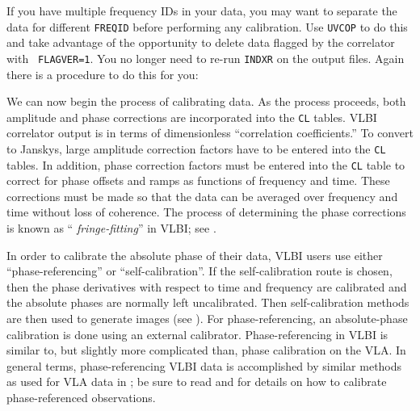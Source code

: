 
If you have multiple frequency IDs in your data, you may want to
separate the data for different {\tt FREQID} before performing any
calibration.  Use {\tt UVCOP} to do this and take advantage of the
opportunity to delete data flagged by the correlator with {\tt
FLAGVER=1}\@.  You no longer need to re-run {\tt INDXR} on the
output files.  Again there is a procedure to do this for you:

We can now begin the process of calibrating  data.  As the
 process proceeds, both amplitude and phase
corrections are incorporated into the {\tt CL} tables. VLBI correlator
output is in terms of dimensionless ``correlation coefficients.''  To
convert to Janskys, large amplitude correction factors have to be
entered into the {\tt CL} tables.  In addition, phase correction
factors must be entered into the {\tt CL} table to correct for phase
offsets and ramps as functions of frequency and time.  These
corrections must be made so that the data can be averaged over
frequency and time without loss of coherence.  The process of
determining the phase corrections is known as ``{\it
fringe-fitting\/}'' in VLBI; see .

In order to calibrate the absolute phase of their data, VLBI users
use either ``phase-referencing'' or ``self-calibration''.  If the
self-calibration route is chosen, then the phase derivatives
with respect to time and frequency are calibrated and the absolute
phases are normally left uncalibrated.  Then self-calibration
methods are then used to generate images (see ).  For
phase-referencing, an absolute-phase calibration is done using an
external calibrator.  Phase-referencing in VLBI is similar to, but
slightly more complicated than, phase calibration on the VLA\@.  In
general terms, phase-referencing VLBI data is accomplished by
similar methods as used for VLA data in \AIPS; be sure to read
 and  for details on how to calibrate
phase-referenced observations.

